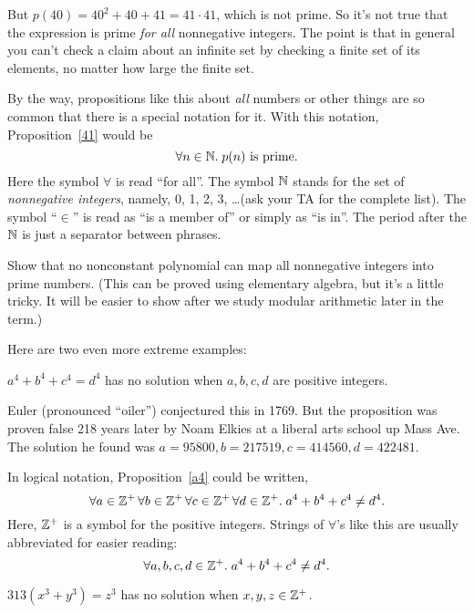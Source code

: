 But $p(40) = 40^2 + 40 + 41 = 41 \cdot 41$, which is not prime.  So it's
not true that the expression is prime {\em for all} nonnegative integers.
The point is that in general you can't check a claim about an infinite set
by checking a finite set of its elements, no matter how large the finite
set.

By the way, propositions like this about \emph{all} numbers or other
things are so common that there is a special notation for it.  With this notation,
Proposition~\ref{41} would be
\begin{equation}\label{pn}
\forall n \in \mathbb{N}.\; p(n) \text{ is prime}.
\end{equation}
Here the symbol $\forall$ is read ``for all''.  The symbol $\mathbb{N}$
stands for the set of {\em nonnegative integers}, namely, 0, 1, 2, 3,
\dots (ask your TA for the complete list).  The symbol ``$\in$'' is read
as ``is a member of'' or simply as ``is in''.  The period after the
$\mathbb{N}$ is just a separator between phrases.

\begin{notesproblem}
Show that no nonconstant polynomial can map all nonnegative integers into
prime numbers.  (This can be proved using elementary algebra, but it's a
little tricky.  It will be easier to show after we study modular
arithmetic later in the term.)
\end{notesproblem}


Here are two even more extreme examples:
\begin{proposition}\label{a4}
$a^4 + b^4 + c^4 = d^4$ has no solution when $a, b, c, d$ are positive
integers.
\end{proposition}
Euler (pronounced ``oiler'') conjectured this in 1769.  But the proposition
was proven false 218 years later by Noam Elkies at a liberal arts school
up Mass Ave.  The solution he found was $a = 95800, b = 217519, c = 414560, d
= 422481$.

In logical notation, Proposition~\ref{a4} could be written,
\[
\forall a \in \mathbb{Z}^+\, \forall b \in \mathbb{Z}^+\, \forall c \in \mathbb{Z}^+\, \forall
d \in \mathbb{Z}^+.\; a^4 + b^4 + c^4 \neq d^4.
\]
Here, $\mathbb{Z}^+$ is a symbol for the positive integers.
Strings of $\forall$'s like this are usually abbreviated for easier reading:
\[
\forall a, b, c, d \in \mathbb{Z}^+.\; a^4 + b^4 + c^4 \neq d^4.
\]


\begin{proposition}
$313 (x^3 + y^3) = z^3$ has no solution when $x, y, z\in\mathbb{Z}^+$.
\end{proposition}

